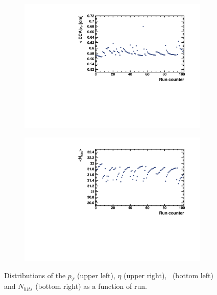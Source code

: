 \begin{figure}[ht]
\begin{subfigure}{.49\textwidth}
        \includegraphics[width=1.\linewidth]{Figures/DCAVsRun.pdf}
    \end{subfigure}
    \begin{subfigure}{.49\textwidth}
        \centering
        \includegraphics[width=1.\linewidth]{Figures/NhitsFitVsRun.pdf}
    \end{subfigure}
    \label{fig:TrackVsRun}
    \caption{Distributions of the $p_{T}$ (upper left), $\eta$ (upper right), \DCA\ (bottom left) and $N_{hits}$ (bottom right) as a function of run.}
\end{figure}